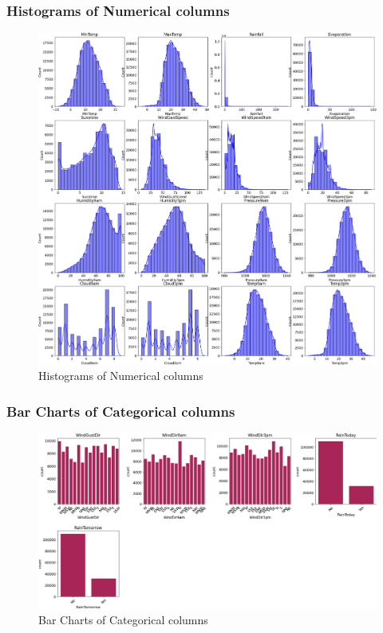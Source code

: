 \documentclass{article}%
\begin{document}
\subsubsection{Histograms of Numerical columns}%
\label{ssubsec:HistogramsofNumericalcolumns}%


\begin{figure}[h!]%
\centering%
\includegraphics[width=460px]{Results/EDA/histograms.png}%
\caption{Histograms of Numerical columns}%
\end{figure}

%
\newpage%
\subsubsection{Bar Charts of Categorical columns}%
\label{ssubsec:BarChartsofCategoricalcolumns}%


\begin{figure}[h!]%
\centering%
\includegraphics[width=460px]{Results/EDA/bar_charts.png}%
\caption{Bar Charts of Categorical columns}%
\end{figure}
\end{document}

